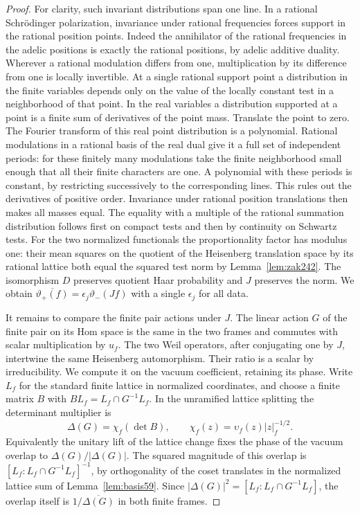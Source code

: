 \documentclass[a4paper,11pt]{article}
\theoremstyle{definition}
\theoremstyle{remark}
\numberwithin{equation}{section}
\begin{document}
\begin{proof}
For clarity, such invariant distributions span one line. In a
rational Schr\"odinger polarization, invariance under rational
frequencies forces support in the rational position points.
Indeed the annihilator of the rational frequencies in the
adelic positions is exactly the rational positions, by adelic
additive duality. Wherever a rational modulation differs from
one, multiplication by its difference from one is locally
invertible. At a single rational support point a distribution
in the finite variables depends only on the value of the
locally constant test in a neighborhood of that point. In the
real variables a distribution supported at a point is a finite
sum of derivatives of the point mass. Translate the point to
zero. The Fourier transform of this real point distribution
is a polynomial. Rational modulations in a rational basis of
the real dual give it a full set of independent periods: for
these finitely many modulations take the finite neighborhood
small enough that all their finite characters are one.
A polynomial with these periods is constant, by restricting
successively to the corresponding lines. This rules out the
derivatives of positive order. Invariance under rational
position translations then makes all masses equal. The equality
with a multiple of the rational summation distribution follows
first on compact tests and then by continuity on Schwartz tests.
For the two normalized functionals the proportionality factor
has modulus one: their mean squares on the quotient of the
Heisenberg translation space by its rational lattice both
equal the squared test norm by Lemma~\ref{lem:zak242}.
The isomorphism \(D\) preserves quotient Haar probability and
\(J\) preserves the norm. We obtain
\(\overline{\vartheta_+(f)}=\epsilon_j\vartheta_-(Jf)\)
with a single \(\epsilon_j\) for all data.

It remains to compare the finite pair actions under \(J\).
The linear action \(G\) of the finite pair on its Hom space
is the same in the two frames and commutes with scalar
multiplication by \(u_f\). The two Weil operators, after
conjugating one by \(J\), intertwine the same Heisenberg
automorphism. Their ratio is a scalar by irreducibility.
We compute it on the vacuum coefficient, retaining its phase.
Write \(L_f\) for the standard finite lattice in normalized
coordinates, and choose a finite matrix \(B\) with
\(B L_f=L_f\cap G^{-1}L_f\). In the unramified lattice
splitting the determinant multiplier is
\[
       \Delta(G)=\chi_f(\det B),\qquad
       \chi_f(z)=\upsilon_f(z)|z|_f^{-1/2}.
\]
Equivalently the unitary lift of the lattice change fixes the
phase of the vacuum overlap to \(\Delta(G)/|\Delta(G)|\).
The squared magnitude of this overlap is
\([L_f:L_f\cap G^{-1}L_f]^{-1}\), by orthogonality of
the coset translates in the normalized lattice sum of
Lemma~\ref{lem:basis59}. Since
\(|\Delta(G)|^2=[L_f:L_f\cap G^{-1}L_f]\), the overlap
itself is \(1/\overline{\Delta(G)}\) in both finite frames.


\end{proof}
\end{document}
